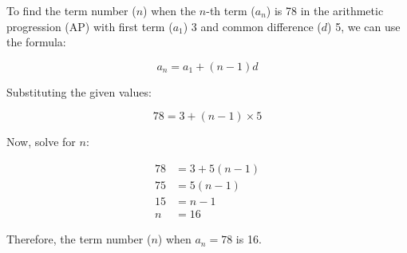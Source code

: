 \documentclass{article}
\begin{document}
To find the term number (\( n \)) when the \(n\)-th term (\( a_n \)) is 78 in the arithmetic progression (AP) with first term (\( a_1 \)) 3 and common difference (\( d \)) 5, we can use the formula:

\[ a_n = a_1 + (n-1)d \]

Substituting the given values:

\[ 78 = 3 + (n-1) \times 5 \]

Now, solve for \( n \):

\begin{align*}
78 &= 3 + 5(n-1) \\
75 &= 5(n-1) \\
15 &= n-1 \\
n &= 16
\end{align*}

Therefore, the term number (\( n \)) when \( a_n = 78 \) is 16.
\end{document}
